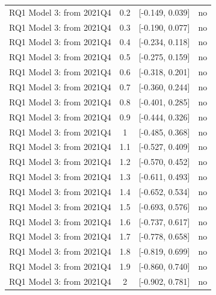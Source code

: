 \begin{table}[htbp]
\begin{tabular}{lccc}
RQ1 Model 3: from 2021Q4 & 0.2 & [-0.149, 0.039] & no \\
RQ1 Model 3: from 2021Q4 & 0.3 & [-0.190, 0.077] & no \\
RQ1 Model 3: from 2021Q4 & 0.4 & [-0.234, 0.118] & no \\
RQ1 Model 3: from 2021Q4 & 0.5 & [-0.275, 0.159] & no \\
RQ1 Model 3: from 2021Q4 & 0.6 & [-0.318, 0.201] & no \\
RQ1 Model 3: from 2021Q4 & 0.7 & [-0.360, 0.244] & no \\
RQ1 Model 3: from 2021Q4 & 0.8 & [-0.401, 0.285] & no \\
RQ1 Model 3: from 2021Q4 & 0.9 & [-0.444, 0.326] & no \\
RQ1 Model 3: from 2021Q4 & 1 & [-0.485, 0.368] & no \\
RQ1 Model 3: from 2021Q4 & 1.1 & [-0.527, 0.409] & no \\
RQ1 Model 3: from 2021Q4 & 1.2 & [-0.570, 0.452] & no \\
RQ1 Model 3: from 2021Q4 & 1.3 & [-0.611, 0.493] & no \\
RQ1 Model 3: from 2021Q4 & 1.4 & [-0.652, 0.534] & no \\
RQ1 Model 3: from 2021Q4 & 1.5 & [-0.693, 0.576] & no \\
RQ1 Model 3: from 2021Q4 & 1.6 & [-0.737, 0.617] & no \\
RQ1 Model 3: from 2021Q4 & 1.7 & [-0.778, 0.658] & no \\
RQ1 Model 3: from 2021Q4 & 1.8 & [-0.819, 0.699] & no \\
RQ1 Model 3: from 2021Q4 & 1.9 & [-0.860, 0.740] & no \\
RQ1 Model 3: from 2021Q4 & 2 & [-0.902, 0.781] & no \\
\bottomrule
\end{tabular}
\par\vspace{2pt}{\footnotesize Relative-magnitudes restriction: each post-period violation of parallel trends is at most M̄ times the largest pre-period one. Robust sets from the HonestDiD R package (step 08); the breakdown M̄ is the largest M̄ at which zero is excluded.}
\end{table}
